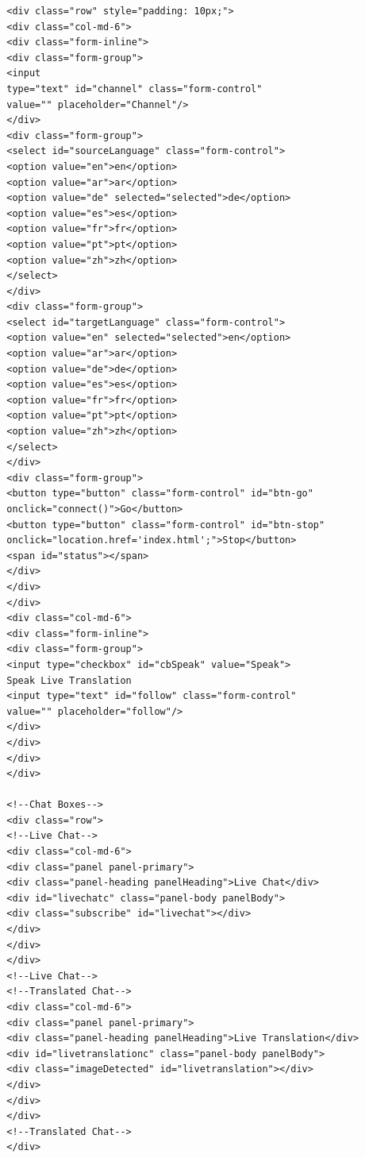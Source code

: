 \documentclass[english,runningheads,a4paper]{llncs}[2018/03/10]
\begin{document}
\begin{verbatim}
        <div class="row" style="padding: 10px;">
        <div class="col-md-6">
        <div class="form-inline">
        <div class="form-group">
        <input 
        type="text" id="channel" class="form-control" 
        value="" placeholder="Channel"/>
        </div>
        <div class="form-group">
        <select id="sourceLanguage" class="form-control">
        <option value="en">en</option>
        <option value="ar">ar</option>
        <option value="de" selected="selected">de</option>
        <option value="es">es</option>
        <option value="fr">fr</option>
        <option value="pt">pt</option>
        <option value="zh">zh</option>
        </select>
        </div>
        <div class="form-group">
        <select id="targetLanguage" class="form-control">
        <option value="en" selected="selected">en</option>
        <option value="ar">ar</option>
        <option value="de">de</option>
        <option value="es">es</option>
        <option value="fr">fr</option>
        <option value="pt">pt</option>
        <option value="zh">zh</option>
        </select>
        </div>
        <div class="form-group">
        <button type="button" class="form-control" id="btn-go" 
        onclick="connect()">Go</button>
        <button type="button" class="form-control" id="btn-stop"
        onclick="location.href='index.html';">Stop</button>
        <span id="status"></span>
        </div>
        </div>
        </div>
        <div class="col-md-6">
        <div class="form-inline">
        <div class="form-group">
        <input type="checkbox" id="cbSpeak" value="Speak"> 
        Speak Live Translation
        <input type="text" id="follow" class="form-control" 
        value="" placeholder="follow"/>
        </div>
        </div>
        </div>
        </div>
        
        <!--Chat Boxes-->
        <div class="row">
        <!--Live Chat-->
        <div class="col-md-6">
        <div class="panel panel-primary">
        <div class="panel-heading panelHeading">Live Chat</div>
        <div id="livechatc" class="panel-body panelBody">
        <div class="subscribe" id="livechat"></div>
        </div>
        </div>
        </div>
        <!--Live Chat-->
        <!--Translated Chat-->
        <div class="col-md-6">
        <div class="panel panel-primary">
        <div class="panel-heading panelHeading">Live Translation</div>
        <div id="livetranslationc" class="panel-body panelBody">
        <div class="imageDetected" id="livetranslation"></div>
        </div>
        </div>
        </div>
        <!--Translated Chat-->
        </div>
        

\end{verbatim}
\end{document}
